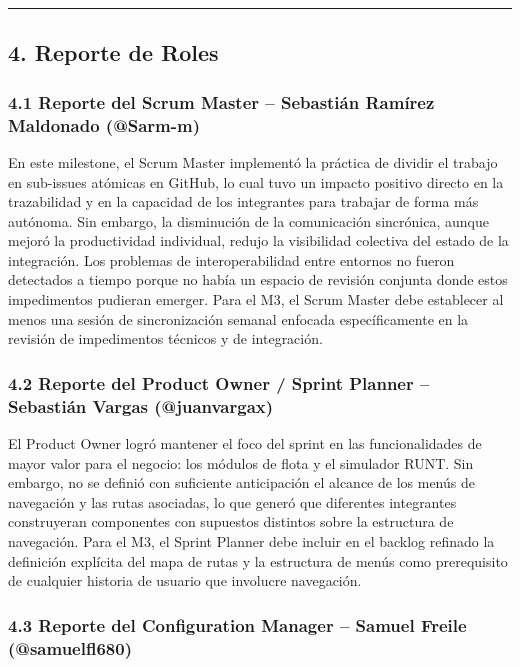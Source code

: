 \documentclass[11pt,a4paper]{article}
\begin{document}
\vspace{0.6em}\hrule\vspace{0.8em}

\subsection{4. Reporte de Roles}

\subsubsection{4.1 Reporte del Scrum Master -- Sebastián Ramírez Maldonado (@Sarm-m)}

En este milestone, el Scrum Master implementó la práctica de dividir el trabajo en sub-issues atómicas en GitHub, lo cual tuvo un impacto positivo directo en la trazabilidad y en la capacidad de los integrantes para trabajar de forma más autónoma. Sin embargo, la disminución de la comunicación sincrónica, aunque mejoró la productividad individual, redujo la visibilidad colectiva del estado de la integración. Los problemas de interoperabilidad entre entornos no fueron detectados a tiempo porque no había un espacio de revisión conjunta donde estos impedimentos pudieran emerger. Para el M3, el Scrum Master debe establecer al menos una sesión de sincronización semanal enfocada específicamente en la revisión de impedimentos técnicos y de integración.

\subsubsection{4.2 Reporte del Product Owner / Sprint Planner -- Sebastián Vargas (@juanvargax)}

El Product Owner logró mantener el foco del sprint en las funcionalidades de mayor valor para el negocio: los módulos de flota y el simulador RUNT. Sin embargo, no se definió con suficiente anticipación el alcance de los menús de navegación y las rutas asociadas, lo que generó que diferentes integrantes construyeran componentes con supuestos distintos sobre la estructura de navegación. Para el M3, el Sprint Planner debe incluir en el backlog refinado la definición explícita del mapa de rutas y la estructura de menús como prerequisito de cualquier historia de usuario que involucre navegación.

\subsubsection{4.3 Reporte del Configuration Manager -- Samuel Freile (@samuelfl680)}
\end{document}

